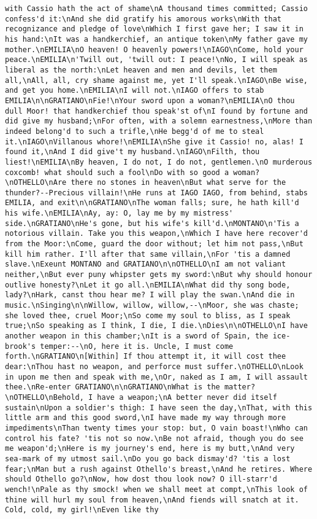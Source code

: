 \begin{verbatim}
with Cassio hath the act of shame\nA thousand times committed; Cassio confess'd it:\nAnd she did gratify his amorous works\nWith that recognizance and pledge of love\nWhich I first gave her; I saw it in his hand:\nIt was a handkerchief, an antique token\nMy father gave my mother.\nEMILIA\nO heaven! O heavenly powers!\nIAGO\nCome, hold your peace.\nEMILIA\n'Twill out, 'twill out: I peace!\nNo, I will speak as liberal as the north:\nLet heaven and men and devils, let them all,\nAll, all, cry shame against me, yet I'll speak.\nIAGO\nBe wise, and get you home.\nEMILIA\nI will not.\nIAGO offers to stab EMILIA\n\nGRATIANO\nFie!\nYour sword upon a woman?\nEMILIA\nO thou dull Moor! that handkerchief thou speak'st of\nI found by fortune and did give my husband;\nFor often, with a solemn earnestness,\nMore than indeed belong'd to such a trifle,\nHe begg'd of me to steal it.\nIAGO\nVillanous whore!\nEMILIA\nShe give it Cassio! no, alas! I found it,\nAnd I did give't my husband.\nIAGO\nFilth, thou liest!\nEMILIA\nBy heaven, I do not, I do not, gentlemen.\nO murderous coxcomb! what should such a fool\nDo with so good a woman?\nOTHELLO\nAre there no stones in heaven\nBut what serve for the thunder?--Precious villain!\nHe runs at IAGO IAGO, from behind, stabs EMILIA, and exit\n\nGRATIANO\nThe woman falls; sure, he hath kill'd his wife.\nEMILIA\nAy, ay: O, lay me by my mistress' side.\nGRATIANO\nHe's gone, but his wife's kill'd.\nMONTANO\n'Tis a notorious villain. Take you this weapon,\nWhich I have here recover'd from the Moor:\nCome, guard the door without; let him not pass,\nBut kill him rather. I'll after that same villain,\nFor 'tis a damned slave.\nExeunt MONTANO and GRATIANO\n\nOTHELLO\nI am not valiant neither,\nBut ever puny whipster gets my sword:\nBut why should honour outlive honesty?\nLet it go all.\nEMILIA\nWhat did thy song bode, lady?\nHark, canst thou hear me? I will play the swan.\nAnd die in music.\nSinging\n\nWillow, willow, willow,--\nMoor, she was chaste; she loved thee, cruel Moor;\nSo come my soul to bliss, as I speak true;\nSo speaking as I think, I die, I die.\nDies\n\nOTHELLO\nI have another weapon in this chamber;\nIt is a sword of Spain, the ice-brook's temper:--\nO, here it is. Uncle, I must come forth.\nGRATIANO\n[Within] If thou attempt it, it will cost thee dear:\nThou hast no weapon, and perforce must suffer.\nOTHELLO\nLook in upon me then and speak with me,\nOr, naked as I am, I will assault thee.\nRe-enter GRATIANO\n\nGRATIANO\nWhat is the matter?\nOTHELLO\nBehold, I have a weapon;\nA better never did itself sustain\nUpon a soldier's thigh: I have seen the day,\nThat, with this little arm and this good sword,\nI have made my way through more impediments\nThan twenty times your stop: but, O vain boast!\nWho can control his fate? 'tis not so now.\nBe not afraid, though you do see me weapon'd;\nHere is my journey's end, here is my butt,\nAnd very sea-mark of my utmost sail.\nDo you go back dismay'd? 'tis a lost fear;\nMan but a rush against Othello's breast,\nAnd he retires. Where should Othello go?\nNow, how dost thou look now? O ill-starr'd wench!\nPale as thy smock! when we shall meet at compt,\nThis look of thine will hurl my soul from heaven,\nAnd fiends will snatch at it. Cold, cold, my girl!\nEven like thy 
\end{verbatim}
